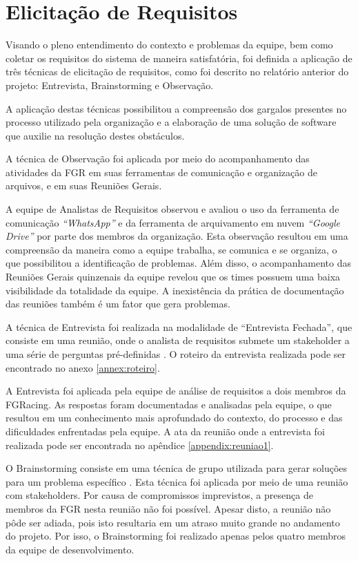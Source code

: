 \section{Elicitação de Requisitos}

Visando o pleno entendimento do contexto e problemas da equipe, bem como coletar os requisitos do sistema de
maneira satisfatória, foi definida a aplicação de três técnicas de elicitação de requisitos, como foi descrito no
relatório anterior do projeto: Entrevista, Brainstorming e Observação.

A aplicação destas técnicas possibilitou a compreensão dos gargalos presentes no processo utilizado pela organização e a
elaboração de uma solução de software que auxilie na resolução destes obstáculos.

A técnica de Observação foi aplicada por meio do acompanhamento das atividades da FGR em suas ferramentas de comunicação e
organização de arquivos, e em suas Reuniões Gerais.

A equipe de Analistas de Requisitos observou e avaliou o uso da ferramenta de comunicação \textit{“WhatsApp”} e da ferramenta de
arquivamento em nuvem \textit{“Google Drive”} por parte dos membros da organização. Esta observação resultou em uma compreensão da
maneira como a equipe trabalha, se comunica e se organiza, o que possibilitou a identificação de problemas. Além disso, o
acompanhamento das Reuniões Gerais quinzenais da equipe revelou que os times possuem uma baixa visibilidade da totalidade
da equipe. A inexistência da prática de documentação das reuniões também é um fator que gera problemas.

A técnica de Entrevista foi realizada na modalidade de “Entrevista Fechada”, que consiste em uma reunião, onde o analista
de requisitos submete um stakeholder a uma série de perguntas pré-definidas \cite{gunda2008}. O roteiro da entrevista realizada
pode ser encontrado no anexo \ref{annex:roteiro}.

A Entrevista foi aplicada pela equipe de análise de requisitos a dois membros da FGRacing. As respostas foram documentadas
e analisadas pela equipe, o que resultou em um conhecimento mais aprofundado do contexto, do processo e das dificuldades
enfrentadas pela equipe. A ata da reunião onde a entrevista foi realizada pode ser encontrada no apêndice \ref{appendix:reuniao1}.

O Brainstorming consiste em uma técnica de grupo utilizada para gerar soluções para um problema específico \cite{gunda2008}.
Esta técnica foi aplicada por meio de uma reunião com stakeholders. Por causa de compromissos imprevistos, a presença de
membros da FGR nesta reunião não foi possível. Apesar disto, a reunião não pôde ser adiada, pois isto resultaria em um
atraso muito grande no andamento do projeto. Por isso, o Brainstorming foi realizado apenas pelos quatro membros da equipe
de desenvolvimento.

